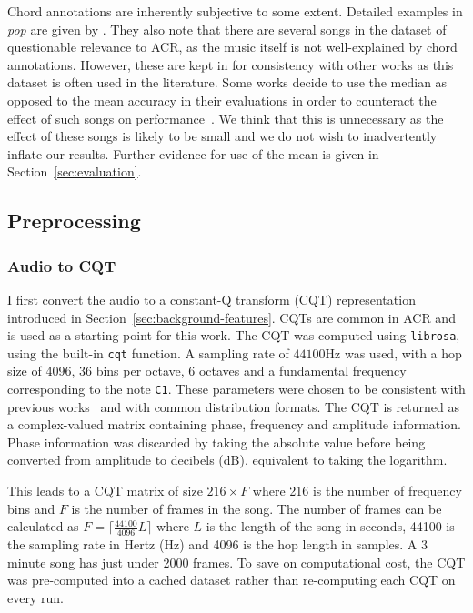 Chord annotations are inherently subjective to some extent. Detailed examples in \emph{pop} are given by \citet{FourTimelyInsights}. They also note that there are several songs in the dataset of questionable relevance to ACR, as the music itself is not well-explained by chord annotations. However, these are kept in for consistency with other works as this dataset is often used in the literature. Some works decide to use the median as opposed to the mean accuracy in their evaluations in order to counteract the effect of such songs on performance~\citep{StructuredTraining}. We think that this is unnecessary as the effect of these songs is likely to be small and we do not wish to inadvertently inflate our results. Further evidence for use of the mean is given in Section~\ref{sec:evaluation}.

\subsection{Preprocessing}

\subsubsection{Audio to CQT}\label{sec:audio-to-cqt}

I first convert the audio to a constant-Q transform (CQT) representation introduced in Section~\ref{sec:background-features}. CQTs are common in ACR and is used as a starting point for this work. The CQT was computed using \texttt{librosa}, using the built-in \texttt{cqt} function. A sampling rate of $44100$Hz was used, with a hop size of 4096, 36 bins per octave, 6 octaves and a fundamental frequency corresponding to the note \texttt{C1}. These parameters were chosen to be consistent with previous works~\citep{StructuredTraining} and with common distribution formats. The CQT is returned as a complex-valued matrix containing phase, frequency and amplitude information. Phase information was discarded by taking the absolute value before being converted from amplitude to decibels (dB), equivalent to taking the logarithm.

This leads to a CQT matrix of size $216 \times F$ where 216 is the number of frequency bins and $F$ is the number of frames in the song. The number of frames can be calculated as $F = \lceil \frac{44100}{4096} L  \rceil$ where $L$ is the length of the song in seconds, 44100 is the sampling rate in Hertz (Hz) and 4096 is the hop length in samples. A 3 minute song has just under 2000 frames. To save on computational cost, the CQT was pre-computed into a cached dataset rather than re-computing each CQT on every run.

